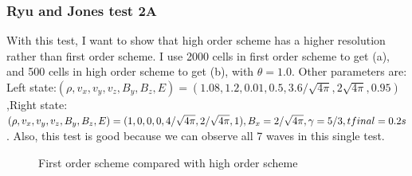 \documentclass[11pt, oneside]{article}   	%
\begin{document}
\subsubsection{Ryu and Jones test 2A}
With this test, I want to show that high order scheme has a higher resolution rather than first order scheme. I use 2000 cells in first order scheme to get (a), and 500 cells in high order scheme to get (b), with $\theta = 1.0$. Other parameters are:  Left state:$ (\rho, v_x, v_y, v_z, B_y, B_z, E) = (1.08, 1.2, 0.01, 0.5, 3.6/\sqrt{4\pi},2\sqrt{4\pi},0.95) $,Right state: $(\rho, v_x, v_y, v_z, B_y, B_z, E) = (1,0,0,0,4/\sqrt{4\pi},2/\sqrt{4\pi},1),
\\ B_x = 2/\sqrt{4\pi}, \gamma = 5/3, tfinal = 0.2s$. Also, this test is good because we can observe all 7 waves in this single test.

\begin{figure}[H]
\centering
{}
\caption{First order scheme compared with high order scheme }
\end{figure}
\end{document}
